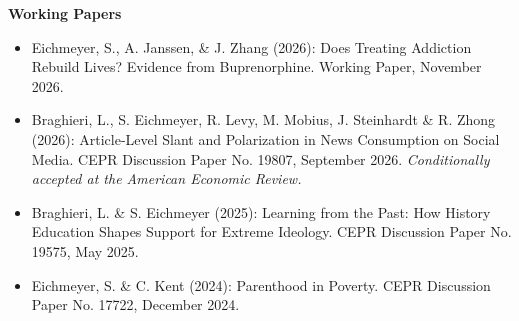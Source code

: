 \documentclass[letterpaper,11pt]{article}
\begin{document}
\begin{normalsize}
\bigskip

\textbf{Working Papers} 
\begin{itemize}[leftmargin=*]
\itemsep0em 
\item Eichmeyer, S., A. Janssen, \& J. Zhang (2026): Does Treating Addiction Rebuild Lives? Evidence from Buprenorphine. Working Paper, November 2026.
\item Braghieri, L., S. Eichmeyer, R. Levy, M. Mobius, J. Steinhardt \& R. Zhong (2026):  Article-Level Slant and Polarization in News Consumption on Social Media. CEPR Discussion Paper No. 19807, September 2026. \textit{Conditionally accepted at the American Economic Review.}
\item Braghieri, L. \& S. Eichmeyer (2025): Learning from the Past: How History Education Shapes Support for Extreme Ideology. CEPR Discussion Paper No. 19575, May 2025.
\item Eichmeyer, S. \& C. Kent (2024): Parenthood in Poverty. CEPR Discussion Paper No. 17722, December 2024.
\end{itemize}

\bigskip

\bigskip

{ %

}
\end{normalsize}
\end{document}
